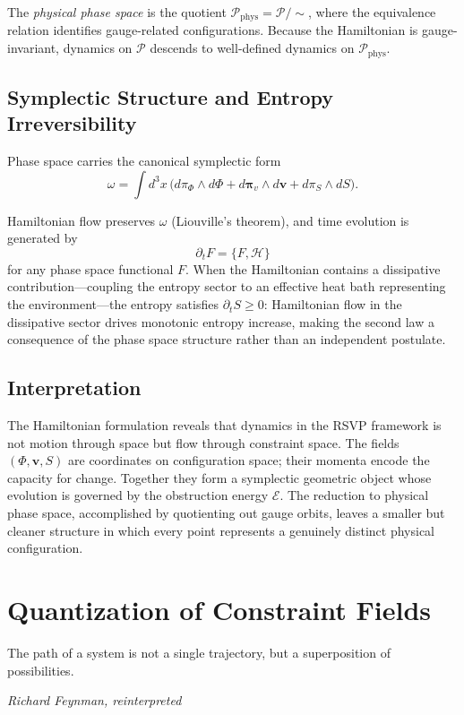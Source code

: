 \documentclass[12pt,a4paper,openany]{book}
\theoremstyle{plain}
\theoremstyle{definition}
\theoremstyle{remark}
\begin{document}
The \emph{physical phase space} is the quotient $\mathcal{P}_{\mathrm{phys}} = \mathcal{P}/{\sim}$, where the equivalence relation identifies gauge-related configurations. Because the Hamiltonian is gauge-invariant, dynamics on $\mathcal{P}$ descends to well-defined dynamics on $\mathcal{P}_{\mathrm{phys}}$.

\section{Symplectic Structure and Entropy Irreversibility}

Phase space carries the canonical symplectic form
\[
\omega = \int d^3x\,\bigl(d\pi_\Phi \wedge d\Phi + d\boldsymbol{\pi}_v \wedge d\mathbf{v} + d\pi_S \wedge dS\bigr).
\]

Hamiltonian flow preserves $\omega$ (Liouville's theorem), and time evolution is generated by
\[
\partial_t F = \{F,\mathcal{H}\}
\]
for any phase space functional $F$. When the Hamiltonian contains a dissipative contribution---coupling the entropy sector to an effective heat bath representing the environment---the entropy satisfies $\partial_t S \ge 0$: Hamiltonian flow in the dissipative sector drives monotonic entropy increase, making the second law a consequence of the phase space structure rather than an independent postulate.

\section{Interpretation}

The Hamiltonian formulation reveals that dynamics in the RSVP framework is not motion through space but flow through constraint space. The fields $(\Phi,\mathbf{v},S)$ are coordinates on configuration space; their momenta encode the capacity for change. Together they form a symplectic geometric object whose evolution is governed by the obstruction energy $\mathcal{E}$. The reduction to physical phase space, accomplished by quotienting out gauge orbits, leaves a smaller but cleaner structure in which every point represents a genuinely distinct physical configuration.

\chapter{Quantization of Constraint Fields}
\label{chap:quantization_constraint}

\epigraph{%
  The path of a system is not a single trajectory,
  but a superposition of possibilities.
}{%
  \textit{Richard Feynman, reinterpreted}}
\end{document}
